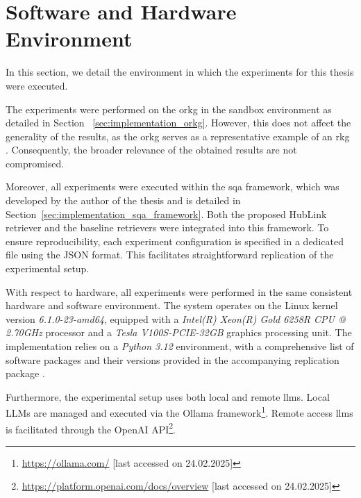 
\section{Software and Hardware Environment}
\label{sec:exp_prelim_environment}

In this section, we detail the environment in which the experiments for this thesis were executed.

The experiments were performed on the \gls{orkg} in the sandbox environment as detailed in Section ~\ref{sec:implementation_orkg}. However, this does not affect the generality of the results, as the \gls{orkg} serves as a representative example of an \gls{rkg} \cite{verma_scholarly_2023}. Consequently, the broader relevance of the obtained results are not compromised.

Moreover, all experiments were executed within the \gls{sqa} framework, which was developed by the author of the thesis and is detailed in Section~\ref{sec:implementation_sqa_framework}. Both the proposed HubLink retriever and the baseline retrievers were integrated into this framework. To ensure reproducibility, each experiment configuration is specified in a dedicated file using the JSON format. This facilitates straightforward replication of the experimental setup.

With respect to hardware, all experiments were performed in the same consistent hardware and software environment. The system operates on the Linux kernel version \emph{6.1.0-23-amd64}, equipped with a \emph{Intel(R) Xeon(R) Gold 6258R CPU @ 2.70GHz} processor and a \emph{Tesla V100S-PCIE-32GB} graphics processing unit. The implementation relies on a \emph{Python 3.12} environment, with a comprehensive list of software packages and their versions provided in the accompanying replication package \cite{schneider_replication_2025}.

Furthermore, the experimental setup uses both local and remote \glspl{llm}. Local LLMs are managed and executed via the Ollama framework\footnote{\url{https://ollama.com/} [last accessed on 24.02.2025]}. Remote access \glspl{llm} is facilitated through the OpenAI API\footnote{\url{https://platform.openai.com/docs/overview} [last accessed on 24.02.2025]}.

